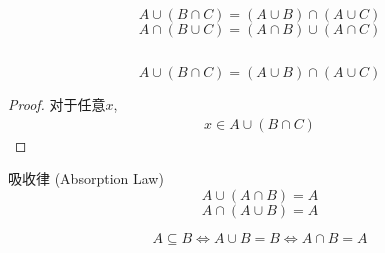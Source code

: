 \begin{frame}{}
  \begin{theorem}
    \[
      A \cup (B \cap C) = (A \cup B) \cap (A \cup C)
    \]
    \[
      A \cap (B \cup C) = (A \cap B) \cup (A \cap C)
    \]
  \end{theorem}

  \begin{columns}
      \pause
      \pause
  \end{columns}
\end{frame}

\begin{frame}{}
  \begin{theorem}
    \[
      A \cup (B \cap C) = (A \cup B) \cap (A \cup C)
    \]
  \end{theorem}

  \begin{proof}
    对于任意$x$,
    \begin{align}
      x \in A \cup (B \cap C)
    \end{align}
  \end{proof}
\end{frame}

\begin{frame}{}
  \begin{theorem}{吸收律 (Absorption Law)}
    \[
      A \cup (A \cap B) = A
    \]
    \[
      A \cap (A \cup B) = A
    \]
  \end{theorem}
\end{frame}

\begin{frame}{}
  \begin{theorem}
    \[
      A \subseteq B \iff A \cup B = B \iff A \cap B = A
    \]
  \end{theorem}
\end{frame}

\begin{frame}{}
  \begin{definition}
    
  \end{definition}

  \vspace{0.30cm}
\end{frame}

